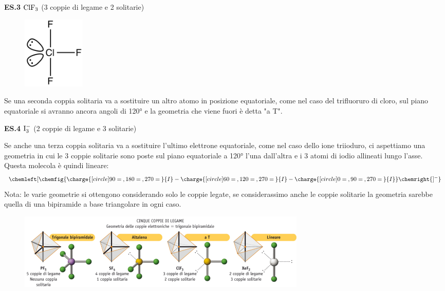 \vspace{0.3cm}\textbf{ES.3} $\rm ClF_3$ (3 coppie di legame e 2 solitarie)

\hspace{0.5cm}\begin{minipage}{0.2\textwidth}
    \begin{figure}[H]
        \includegraphics[width=3cm]{immagini/ClF_3.png}
    \end{figure}
\end{minipage} \hfill
\begin{minipage}{0.65\textwidth}
    \vspace{0.2cm}Se una seconda coppia solitaria va a sostituire un altro atomo in posizione equatoriale, come nel caso del trifluoruro di cloro, sul piano equatoriale si avranno ancora angoli di 120° e la geometria che viene fuori è detta "a T".
\end{minipage}

\vspace{0.2cm}\textbf{ES.4} $\rm I_3^-$ (2 coppie di legame e 3 solitarie)

\vspace{0.2cm}Se anche una terza coppia solitaria va a sostituire l'ultimo elettrone equatoriale, come nel caso dello ione triioduro, ci aspettiamo una geometria in cui le 3 coppie solitarie sono poste sul piano equatoriale a 120° l'una dall'altra e i 3 atomi di iodio allineati lungo l'asse. Questa molecola è quindi lineare:
$$
\chemleft[ \chemfig{\charge{[circle]90=\:,180=\:,270=\:}{I}-\charge{[circle]60=\:,120=\:,270=\:}{I}-\charge{[circle]0=\:,90=\:,270=\:}{I}} \chemright{]^{-}}
$$
Nota: le varie geometrie si ottengono considerando solo le coppie legate, se considerassimo anche le coppie solitarie la geometria sarebbe quella di una bipiramide a base triangolare in ogni caso.
\begin{figure}[htp]
    \centering
    \includegraphics[width=14cm]{immagini/geometrie-5-coppie.png}
\end{figure}
